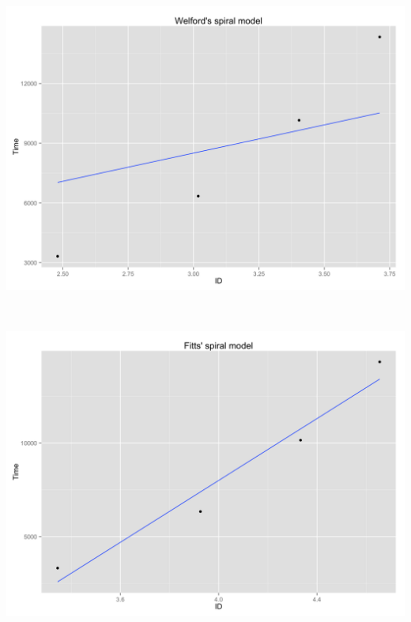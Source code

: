 \begin{minipage}{\linewidth}
	\begin{minipage}[t]{.45\linewidth}
		\includegraphics[width=\textwidth]{images/plots/plot_model_spiral_welford}
		\label{fig:welford_spiral_line}
	\end{minipage}
	\begin{minipage}[b]{0.1\linewidth}
	~
	\end{minipage}
	\begin{minipage}[t]{0.45\linewidth}
		\includegraphics[width=\textwidth]{images/plots/plot_model_spiral_fitt}
		\label{fig:fitt_spiral_line}
	\end{minipage}
\end{minipage}
